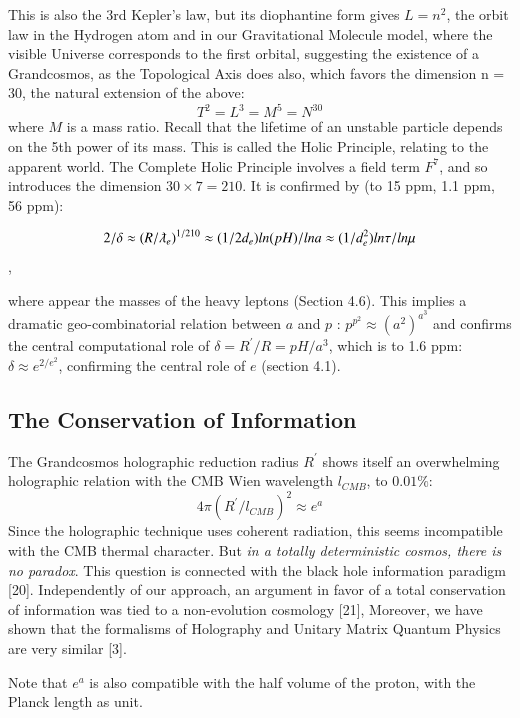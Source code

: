 \documentclass[twoside,draft]{article}
\begin{document}
\begin{sloppypar}
{This is also the 3rd Kepler's law, but its diophantine form gives $L = n^{2}$, the orbit law in the Hydrogen atom and in our
Gravitational Molecule model, where the visible Universe corresponds to the first orbital,
suggesting the existence of a Grandcosmos, as the Topological Axis does also, which favors the
dimension n = 30, the natural extension of the above:
\begin{equation}
T^{2} = L^{3} = M^{5} = N^{30}
\end{equation}
where $M$ is a mass ratio. Recall that the lifetime of an unstable particle depends on the 5th power of its mass. This is called the Holic Principle, relating to the apparent world. The Complete Holic
Principle involves a field term $F^{7}$, and so introduces the dimension $30 \times 7 = 210$. It is confirmed by (to 15 ppm, 1.1 ppm, 56 ppm):

$$2/\delta \approx (R/\lambdabar_{e})^{1/210} \approx (1/2d_{e}) ln(pH)/lna \approx (1/d_e^{2})ln\tau/ln\mu$$,

where appear the masses of the heavy leptons (Section 4.6). This implies a dramatic geo-combinatorial relation between $a$ and $p$ : $p^{p^{2}} \approx (a^{2})^{a^{3}}$ and confirms the central computational role of $\delta = R^{\prime}/R = pH/a^{3}$, which is to 1.6 ppm:$\delta \approx e^{2/e^2}$, confirming the central role of $e$ (section 4.1).


\subsection{The Conservation of Information}

The Grandcosmos holographic reduction radius $R^{\prime}$ shows itself an overwhelming holographic
relation with the CMB Wien wavelength $l_{CMB}$, to $0.01\%$:
\begin{equation}
4\pi(R^{\prime}/l_{CMB})^{2} \approx e^{a}
\end{equation}
Since the holographic technique uses coherent radiation, this seems incompatible with the CMB
thermal character. But \textit{in a totally deterministic cosmos, there is no paradox}. This question is
connected with the black hole information paradigm [20]. Independently of our approach, an
argument in favor of a total conservation of information was tied to a non-evolution cosmology
[21], Moreover, we have shown that the formalisms of Holography and Unitary Matrix Quantum
Physics are very similar [3]. 

Note that $e^{a}$ is also compatible with the half volume of the proton, with
the Planck length as unit.

}
\end{sloppypar}
\end{document}
